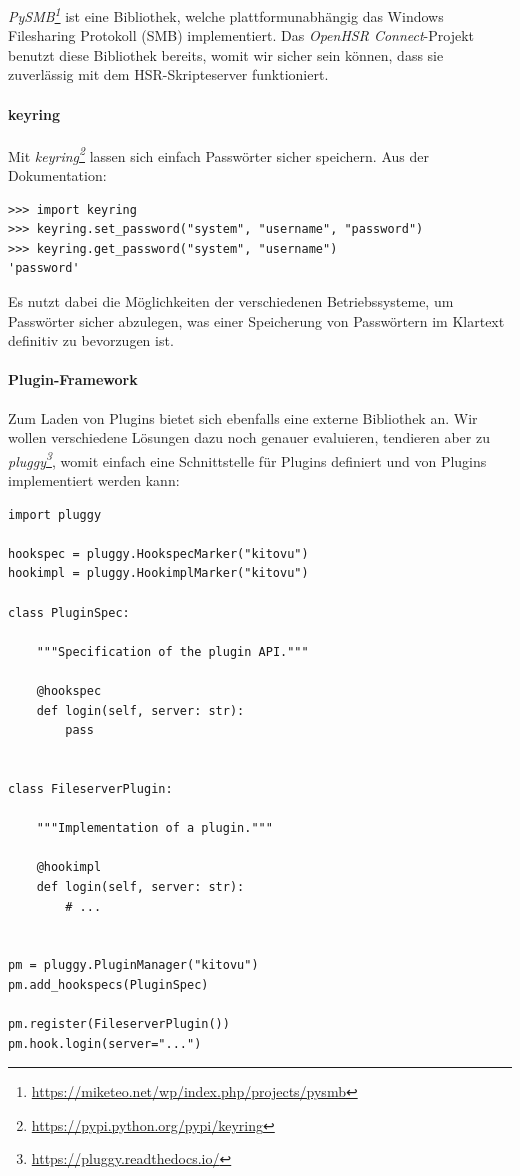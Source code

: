 \documentclass[a4paper]{article}
\newcommand{\tool}[2]{\emph{#1\footnote{\url{#2}}}}
\begin{document}
\tool{PySMB}{https://miketeo.net/wp/index.php/projects/pysmb} ist eine
Bibliothek, welche plattformunabhängig das Windows Filesharing Protokoll (SMB)
implementiert. Das \emph{OpenHSR Connect}-Projekt benutzt diese Bibliothek
bereits, womit wir sicher sein können, dass sie zuverlässig mit dem
HSR-Skripteserver funktioniert.

\paragraph{keyring}

Mit \tool{keyring}{https://pypi.python.org/pypi/keyring} lassen sich einfach
Passwörter sicher speichern. Aus der Dokumentation:

\begin{verbatim}
>>> import keyring
>>> keyring.set_password("system", "username", "password")
>>> keyring.get_password("system", "username")
'password'
\end{verbatim}

Es nutzt dabei die Möglichkeiten der verschiedenen Betriebssysteme, um Passwörter sicher abzulegen, was einer Speicherung von Passwörtern im Klartext definitiv zu bevorzugen ist.

\paragraph{Plugin-Framework}

Zum Laden von Plugins bietet sich ebenfalls eine externe Bibliothek an. Wir
wollen verschiedene Lösungen dazu noch genauer evaluieren, tendieren aber zu
\tool{pluggy}{https://pluggy.readthedocs.io/}, womit einfach eine Schnittstelle
für Plugins definiert und von Plugins implementiert werden kann:

\begin{verbatim}
import pluggy

hookspec = pluggy.HookspecMarker("kitovu")
hookimpl = pluggy.HookimplMarker("kitovu")

class PluginSpec:

    """Specification of the plugin API."""

    @hookspec
    def login(self, server: str):
        pass


class FileserverPlugin:

    """Implementation of a plugin."""

    @hookimpl
    def login(self, server: str):
        # ...


pm = pluggy.PluginManager("kitovu")
pm.add_hookspecs(PluginSpec)

pm.register(FileserverPlugin())
pm.hook.login(server="...")
\end{verbatim}
\end{document}
